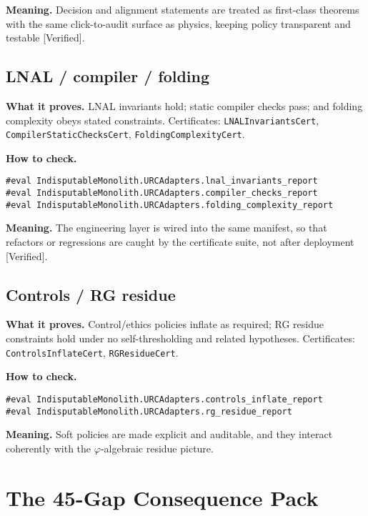 \documentclass[11pt,a4paper,twoside]{article}
\numberwithin{equation}{section}
\newcommand{\phigr}{\varphi} %
\theoremstyle{customthm}
\theoremstyle{customdef}
\theoremstyle{customrem}
\begin{document}
\textbf{Meaning.} Decision and alignment statements are treated as first-class theorems with the same click-to-audit surface as physics, keeping policy transparent and testable [Verified].

\subsection{LNAL / compiler / folding}

\textbf{What it proves.} LNAL invariants hold; static compiler checks pass; and folding complexity obeys stated constraints. Certificates: \texttt{LNALInvariantsCert}, \texttt{CompilerStaticChecksCert}, \texttt{FoldingComplexityCert}.

\textbf{How to check.}

\begin{lstlisting}
#eval IndisputableMonolith.URCAdapters.lnal_invariants_report
#eval IndisputableMonolith.URCAdapters.compiler_checks_report
#eval IndisputableMonolith.URCAdapters.folding_complexity_report
\end{lstlisting}

\textbf{Meaning.} The engineering layer is wired into the same manifest, so that refactors or regressions are caught by the certificate suite, not after deployment [Verified].

\subsection{Controls / RG residue}

\textbf{What it proves.} Control/ethics policies inflate as required; RG residue constraints hold under no self-thresholding and related hypotheses. Certificates: \texttt{ControlsInflateCert}, \texttt{RGResidueCert}.

\textbf{How to check.}

\begin{lstlisting}
#eval IndisputableMonolith.URCAdapters.controls_inflate_report
#eval IndisputableMonolith.URCAdapters.rg_residue_report
\end{lstlisting}

\textbf{Meaning.} Soft policies are made explicit and auditable, and they interact coherently with the $\phigr$-algebraic residue picture.

\section{The 45-Gap Consequence Pack}\label{sec:gap45}
\end{document}
